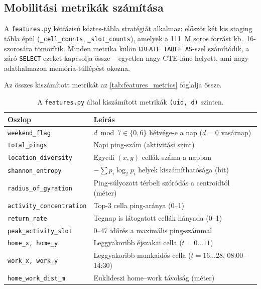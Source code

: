 \subsection{Mobilitási metrikák számítása}

A \texttt{features.py} kétfázisú köztes-tábla stratégiát alkalmaz: először két kis staging tábla épül (\texttt{\_cell\_counts}, \texttt{\_slot\_counts}), amelyek a 111~M soros forrást kb.\ 16-szorosára tömörítik. Minden metrika külön \texttt{CREATE TABLE AS}-szel számítódik, a záró \texttt{SELECT} ezeket kapcsolja össze -- egyetlen nagy CTE-lánc helyett, ami nagy adathalmazon memória-túllépést okozna.

Az összes kiszámított metrikát az \autoref{tab:features_metrics} foglalja össze.

\begin{table}[H]
\centering
\caption{A \texttt{features.py} által kiszámított metrikák \texttt{(uid, d)} szinten.}
\label{tab:features_metrics}
\begin{tabular}{l p{9cm}}
\hline
\textbf{Oszlop} & \textbf{Leírás} \\
\hline
\texttt{weekend\_flag}           & $d \bmod 7 \in \{0, 6\}$ hétvége-e a nap ($d = 0$ vasárnap) \\
\texttt{total\_pings}            & Napi ping-szám (aktivitási szint) \\
\texttt{location\_diversity}     & Egyedi $(x, y)$ cellák száma a napban \\
\texttt{shannon\_entropy}        & $-\sum p_i \log_2 p_i$ helyek kiszámíthatósága (bit) \\
\texttt{radius\_of\_gyration}    & Ping-súlyozott térbeli szóródás a centroidtól (méter) \\
\texttt{activity\_concentration} & Top-3 cella ping-aránya (0--1) \\
\texttt{return\_rate}            & Tegnap is látogatott cellák hányada (0--1) \\
\texttt{peak\_activity\_slot}    & 0--47 időrés a maximális ping-számmal \\
\texttt{home\_x, home\_y}        & Leggyakoribb éjszakai cella ($t = 0\ldots11$) \\
\texttt{work\_x, work\_y}        & Leggyakoribb munkaidős cella ($t = 16\ldots28$, 08:00--14:30) \\
\texttt{home\_work\_dist\_m}     & Euklideszi home--work távolság (méter) \\
\hline
\end{tabular}
\end{table}

